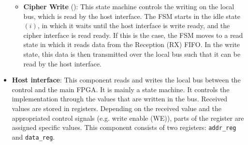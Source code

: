 \begin{itemize}
\begin{itemize}
		\item \textbf{Cipher Write} (): This state machine controls the writing on the local bus, which is read by the host interface. The FSM starts in the idle state $(i)$, in which it waits until the host interface is write ready, and the cipher interface is read ready. If this is the case, the FSM moves to a read state in which it reads data from the Reception (RX) FIFO. In the write state, this data is then transmitted over the local bus such that it can be read by the host interface.
	\end{itemize}
	\item \textbf{Host interface}: This component reads and writes the local bus between the control and the main FPGA. It is mainly a state machine. It controls the implementation through the values that are written in the bus. 
	Received values are stored in registers.
	Depending on the received value and the appropriated control signals (e.g. write enable (WE)), parts of the register are assigned specific values.
	This component consists of two registers: \texttt{addr_reg} and \texttt{data_reg}. 
\end{itemize}
%